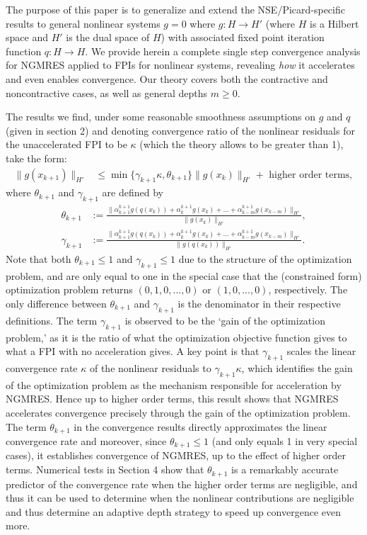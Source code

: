 \documentclass{article}
\numberwithin{equation}{section}
\begin{document}
The purpose of this paper is to generalize and extend the NSE/Picard-specific results to general nonlinear systems $g=0$ where $g:H\rightarrow H'$ (where $H$ is a Hilbert space and $H'$ is the dual space of $H$) with associated fixed point iteration function $q:H\rightarrow H$.  We provide herein a complete single step convergence analysis for NGMRES applied to FPIs for nonlinear systems, revealing {\it how} it accelerates and even enables convergence.  Our theory covers both the contractive and noncontractive cases, as well as general depths $m\ge 0$.  

The results we find, under some reasonable smoothness assumptions on $g$ and $q$ (given in section 2) and denoting convergence ratio of the nonlinear residuals for the unaccelerated FPI to be $\kappa$ (which the theory allows to be greater than 1), take the form:
\begin{align}
\| g(x_{k+1}) \|_{H'} & \le \min\{ \gamma_{k+1} \kappa,\theta_{k+1} \} \| g(x_{k})   \|_{H'} + \mbox{ higher order terms}, 
 \end{align}
where $\theta_{k+1}$ and $\gamma_{k+1}$ are defined by
\begin{align*}
 \theta_{k+1} & := \frac{ \| \alpha^{k+1}_{k+1} g( q(x_k)) + \alpha^{k+1}_k g(x_k) + ... + \alpha^{k+1}_{k-m}g(x_{k-m}) \|_{H'}  }{ \| g(x_k) \|_{H'} }, \\
 \gamma_{k+1}& := \frac{ \| \alpha^{k+1}_{k+1} g(q(x_k) ) + \alpha^{k+1}_k g(x_k) + ... + \alpha^{k+1}_{k-m}g(x_{k-m}) \|_{H'}  }{ \| g(q(x_k)) \|_{H'} }.
 \end{align*}
 Note that both $\theta_{k+1}\le 1$ and $\gamma_{k+1}\le 1$ due to the structure of the optimization problem, and are only equal to one in the special case that the (constrained form) optimization problem returns $(0,1,0,...,0)$ or $(1,0,...,0)$, respectively. The only difference between $\theta_{k+1}$ and $\gamma_{k+1}$ is the denominator in their respective definitions.  The term $\gamma_{k+1}$ is observed to be the `gain of the optimization problem,' as it is the ratio of what the optimization objective function gives to what a FPI with no acceleration gives.   A key point is that $\gamma_{k+1}$ scales the linear convergence rate $\kappa$ of the nonlinear residuals to $\gamma_{k+1}\kappa$, which identifies the gain of the optimization problem as the mechanism responsible for acceleration by NGMRES.  Hence up to higher order terms, this result shows that NGMRES accelerates convergence precisely through the gain of the optimization problem.  The term $\theta_{k+1}$  in the convergence results directly approximates the linear convergence rate and moreover, since $\theta_{k+1}\le 1$ (and only equals 1 in very special cases), it establishes convergence of NGMRES, up to the effect of higher order terms.  Numerical tests in Section 4 show that $\theta_{k+1}$ is a remarkably accurate predictor of the convergence rate when the higher order terms are negligible, and thus it can be used to determine when the nonlinear contributions are negligible and thus determine an adaptive depth strategy to speed up convergence even more. 
\end{document}
